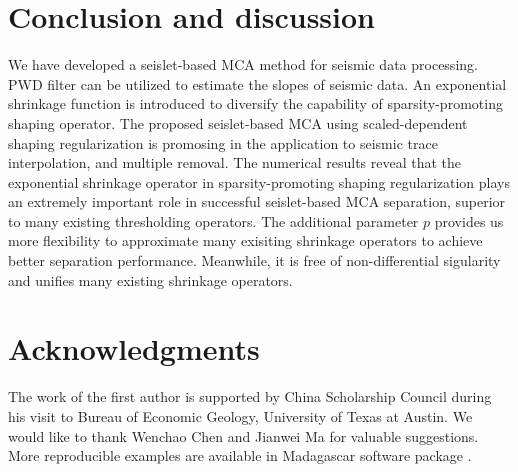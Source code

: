 

  
\section{Conclusion and discussion}

We have developed a seislet-based MCA method for seismic data processing. PWD filter can be utilized to estimate the slopes of seismic data. An exponential shrinkage function is introduced to diversify the capability of sparsity-promoting shaping operator. The proposed seislet-based MCA using scaled-dependent shaping regularization is promosing in the application to seismic trace interpolation, and multiple removal. The numerical results reveal that the exponential shrinkage operator in sparsity-promoting shaping regularization plays an extremely important role in successful seislet-based MCA separation, superior to many existing thresholding operators. The additional parameter $p$ provides us more flexibility to approximate many exisiting shrinkage operators to achieve better separation performance. Meanwhile, it is free of non-differential sigularity and unifies many existing shrinkage operators. 



\section*{Acknowledgments}

The work of the first author is supported by China Scholarship Council during his visit to Bureau of Economic Geology, University of Texas at Austin. We would like to thank Wenchao Chen and Jianwei Ma for valuable suggestions. More reproducible examples are available in  Madagascar software package \citep{m8r}.

